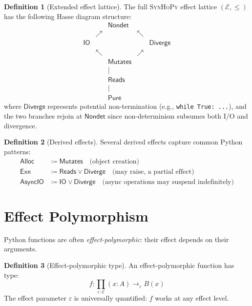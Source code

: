 \documentclass[11pt,a4paper]{report}
\theoremstyle{definition}
\newtheorem{definition}{Definition}[chapter]
\theoremstyle{plain}
\newcommand{\defeq}{\coloneqq}
\newcommand{\Pure}{\mathsf{Pure}}
\newcommand{\Reads}{\mathsf{Reads}}
\newcommand{\Mutates}{\mathsf{Mutates}}
\newcommand{\IO}{\mathsf{IO}}
\newcommand{\Nondet}{\mathsf{Nondet}}
\newcommand{\synhopy}{\textsc{SynHoPy}}
\begin{document}
\begin{definition}[Extended effect lattice]
The full \synhopy{} effect lattice $(\mathcal{E}, \leq)$ has the following
Hasse diagram structure:
\[
  \begin{array}{ccccc}
    & & \Nondet & & \\
    & \nearrow & & \nwarrow & \\
    \IO & & & & \mathsf{Diverge} \\
    & \nwarrow & & \nearrow & \\
    & & \Mutates & & \\
    & & | & & \\
    & & \Reads & & \\
    & & | & & \\
    & & \Pure & &
  \end{array}
\]
where $\mathsf{Diverge}$ represents potential non-termination (e.g.,
\lstinline[style=python]{while True: ...}), and the two branches rejoin at
$\Nondet$ since non-determinism subsumes both I/O and divergence.
\end{definition}

\begin{definition}[Derived effects]
Several derived effects capture common Python patterns:
\begin{align}
  \mathsf{Alloc} &\defeq \Mutates \quad\text{(object creation)} \\
  \mathsf{Exn} &\defeq \Reads \vee \mathsf{Diverge}
    \quad\text{(may raise, a partial effect)} \\
  \mathsf{AsyncIO} &\defeq \IO \vee \mathsf{Diverge}
    \quad\text{(async operations may suspend indefinitely)}
\end{align}
\end{definition}


\section{Effect Polymorphism}

Python functions are often \emph{effect-polymorphic}: their effect depends on
their arguments.

\begin{definition}[Effect-polymorphic type]
An effect-polymorphic function has type:
\[
  f : \prod_{\varepsilon : \mathcal{E}} (x : A) \to_\varepsilon B(x)
\]
The effect parameter $\varepsilon$ is universally quantified: $f$ works at any
effect level.
\end{definition}
\end{document}
